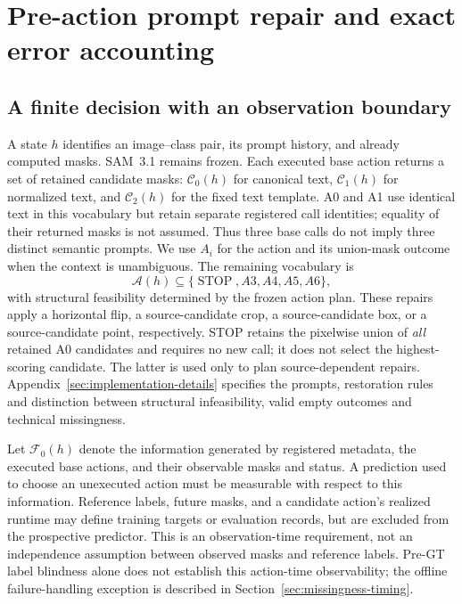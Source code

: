 \section{Pre-action prompt repair and exact error accounting}
\label{sec:formulation}

\subsection{A finite decision with an observation boundary}
A state $h$ identifies an image--class pair, its prompt history, and already
computed masks. SAM~3.1 remains frozen. Each executed base action returns a
set of retained candidate masks: $\mathcal C_0(h)$ for canonical text,
$\mathcal C_1(h)$ for normalized text, and $\mathcal C_2(h)$ for the fixed
text template. A0 and A1 use identical text in this vocabulary but retain
separate registered call identities; equality of their returned masks is
not assumed. Thus three base calls do not imply three distinct semantic
prompts. We use $A_i$ for the action and its union-mask outcome when
the context is unambiguous. The remaining vocabulary is
\begin{equation}
 \mathcal A(h)\subseteq\{\operatorname{STOP},A3,A4,A5,A6\},
 \label{eq:unified-action-set}
\end{equation}
with structural feasibility determined by the frozen action plan. These
repairs apply a horizontal flip, a source-candidate crop, a source-candidate
box, or a source-candidate point, respectively. STOP retains the pixelwise
union of \emph{all} retained A0 candidates and requires no new call; it does
not select the highest-scoring candidate. The latter is used only to plan
source-dependent repairs. Appendix~\ref{sec:implementation-details} specifies
the prompts, restoration rules and distinction between structural
infeasibility, valid empty outcomes and technical missingness.

Let $\mathcal F_0(h)$ denote the information generated by registered metadata,
the executed base actions, and their observable masks and status. A prediction
used to choose an unexecuted action must be measurable with respect to this
information. Reference labels, future masks, and a candidate action's realized
runtime may define training targets or evaluation records, but are excluded
from the prospective predictor. This is an observation-time requirement, not
an independence assumption between observed masks and reference labels.
Pre-GT label blindness alone does not establish this action-time
observability; the offline failure-handling exception is described in
Section~\ref{sec:missingness-timing}.

